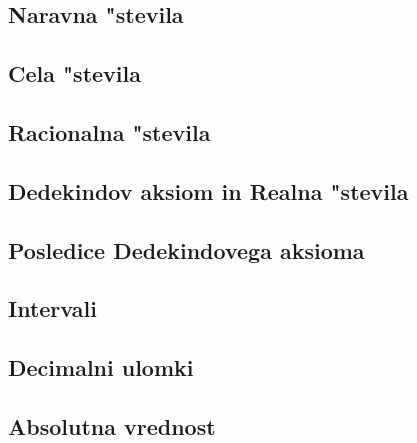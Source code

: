 \subsection{Naravna "stevila}


\subsection{Cela "stevila}


\subsection{Racionalna "stevila}


\subsection{Dedekindov aksiom in Realna "stevila}


\subsection{Posledice Dedekindovega aksioma}


\subsection{Intervali}


\subsection{Decimalni ulomki}


\subsection{Absolutna vrednost}

